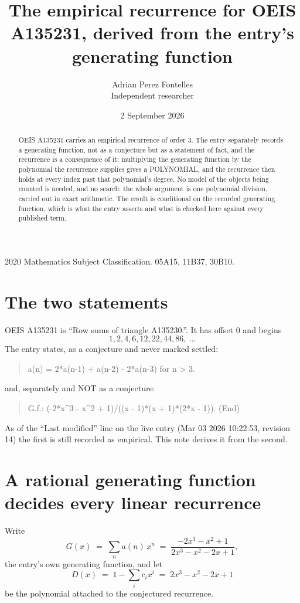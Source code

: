 \documentclass[11pt,a4paper]{article}
\title{The empirical recurrence for OEIS A135231, derived from the entry's generating function}
\author{Adrian Perez Fontelles\\ \small Independent researcher}
\date{2 September 2026}
\theoremstyle{plain}
\theoremstyle{definition}
\begin{document}
\maketitle

\begin{abstract}
OEIS A135231 carries an empirical recurrence of order $3$. The entry separately records a
generating function, not as a conjecture but as a statement of fact, and the recurrence is a
consequence of it: multiplying the generating function by the polynomial the recurrence
supplies gives a POLYNOMIAL, and the recurrence then holds at every index past that
polynomial's degree. No model of the objects being counted is needed, and no search: the
whole argument is one polynomial division, carried out in exact arithmetic. The result is
conditional on the recorded generating function, which is what the entry asserts and what is
checked here against every published term.
\end{abstract}

\noindent\small 2020 Mathematics Subject Classification. 05A15, 11B37, 30B10.\normalsize

\section{The two statements}

OEIS A135231 is ``Row sums of triangle A135230.''. It has offset $0$ and begins
\[
1, 2, 4, 6, 12, 22, 44, 86,\ \dots
\]
The entry states, as a conjecture and never marked settled:
\begin{quote}
a(n) = 2*a(n-1) + a(n-2) - 2*a(n-3) for n > 3.
\end{quote}
and, separately and NOT as a conjecture:
\begin{quote}
G.f.: (-2*x\^{}3 - x\^{}2 + 1)/((x - 1)*(x + 1)*(2*x - 1)). (End)
\end{quote}
As of the ``Last modified'' line on the live entry (Mar 03 2026 10:22:53, revision 14) the first is still
recorded as empirical. This note derives it from the second.

\section{A rational generating function decides every linear recurrence}

Write
\[
G(x)\;=\;\sum_{n}a(n)\,x^{n}\;=\;\frac{- 2 x^{3} - x^{2} + 1}{2 x^{3} - x^{2} - 2 x + 1},
\]
the entry's own generating function, and let
\[
D(x)\;=\;1-\sum_i c_i x^{i}\;=\;2 x^{3} - x^{2} - 2 x + 1
\]
be the polynomial attached to the conjectured recurrence.
\end{document}
